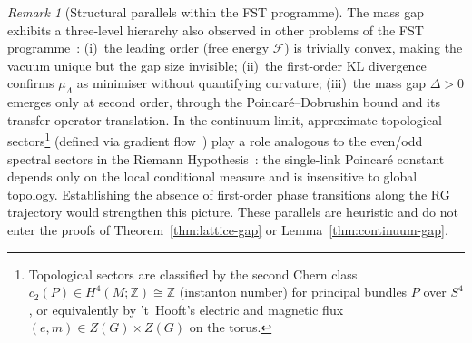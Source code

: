 \documentclass[12pt,a4paper]{article}
\theoremstyle{definition}
\theoremstyle{plain}
\theoremstyle{remark}
\newtheorem{remark}[definition]{Remark}
\begin{document}
\begin{remark}[Structural parallels within the FST programme]\label{rem:fst-parallels}
The mass gap exhibits a three-level hierarchy also observed in
other problems of the FST programme~\cite{FST-Unified2026}: (i)~the
leading order (free energy $\mathcal{F}$) is trivially convex, making
the vacuum unique but the gap size invisible; (ii)~the
first-order KL divergence confirms $\mu_\Lambda$ as minimiser without
quantifying curvature; (iii)~the mass gap $\Delta > 0$ emerges only
at second order, through the Poincar\'e--Dobrushin bound and its
transfer-operator translation. In the continuum limit, approximate
topological sectors\footnote{Topological sectors are classified by the second Chern class $c_2(P) \in H^4(M;\mathbb{Z}) \cong \mathbb{Z}$ (instanton number) for principal bundles $P$ over $S^4$, or equivalently by 't~Hooft's electric and magnetic flux $(e, m) \in Z(G) \times Z(G)$ on the torus.} (defined via gradient flow~\cite{Luscher2010}) play a
role analogous to the even/odd spectral sectors in the
Riemann Hypothesis~\cite{GeigerRH2026c}: the single-link Poincar\'e constant
depends only on the local conditional measure and is insensitive to
global topology. Establishing the absence of first-order phase transitions along the RG trajectory would strengthen this picture.
These parallels are heuristic and do not enter the proofs of
Theorem~\ref{thm:lattice-gap} or Lemma~\ref{thm:continuum-gap}.
\end{remark}
\end{document}
